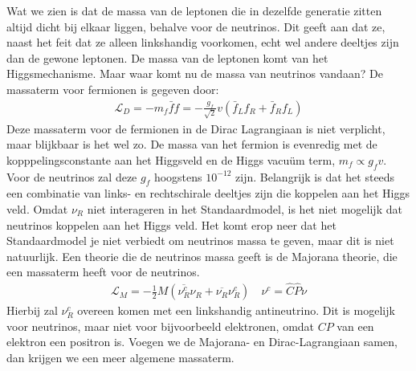 \documentclass[../main.tex]{subfiles}
\begin{document}
Wat we zien is dat de massa van de leptonen die in dezelfde generatie zitten altijd dicht bij elkaar liggen, behalve voor de neutrinos. Dit geeft aan dat ze, naast het feit dat ze alleen linkshandig voorkomen, echt wel andere deeltjes zijn dan de gewone leptonen. De massa van de leptonen komt van het Higgsmechanisme. Maar waar komt nu de massa van neutrinos vandaan? De massaterm voor fermionen is gegeven door:
\begin{equation}
    \begin{aligned}
        \label{eq:massaterm_fermionen}
        \mathcal{L}_{D}=-m_{f} \bar{f} f=-\frac{g_{f}}{\sqrt{2}} v\left(\bar{f}_{L} f_{R}+\bar{f}_{R} f_{L}\right)
    \end{aligned}
\end{equation}
Deze massaterm voor de fermionen in de Dirac Lagrangiaan is niet verplicht, maar blijkbaar is het wel zo. De massa van het fermion is evenredig met de kopppelingsconstante aan het Higgsveld en de Higgs vacuüm term, $m_f\propto g_f v$. Voor de neutrinos zal deze $g_f$ hoogstens $10^{-12}$ zijn. Belangrijk is dat het steeds een combinatie van links- en rechtschirale deeltjes zijn die koppelen aan het Higgs veld. Omdat $\nu_R$ niet interageren in het Standaardmodel, is het niet mogelijk dat neutrinos koppelen aan het Higgs veld. Het komt erop neer dat het Standaardmodel je niet verbiedt om neutrinos massa te geven, maar dit is niet natuurlijk. Een theorie die de neutrinos massa geeft is de Majorana theorie, die een massaterm heeft voor de neutrinos.
\begin{equation}
    \begin{aligned}
        \label{eq:majorana_massaterm}
        \mathcal{L}_{M}=-\frac{1}{2} M\left(\overline{\nu_{R}^{c}} \nu_{R}+\overline{\nu_{R}} \nu_{R}^{c}\right) \quad \nu^{c}=\hat{C} \hat{P}\nu
    \end{aligned}
\end{equation}
Hierbij zal $\nu_R^c$ overeen komen met een linkshandig antineutrino. Dit is mogelijk voor neutrinos, maar niet voor bijvoorbeeld elektronen, omdat $CP$ van een elektron een positron is. Voegen we de Majorana- en Dirac-Lagrangiaan samen, dan krijgen we een meer algemene massaterm.
\end{document}
